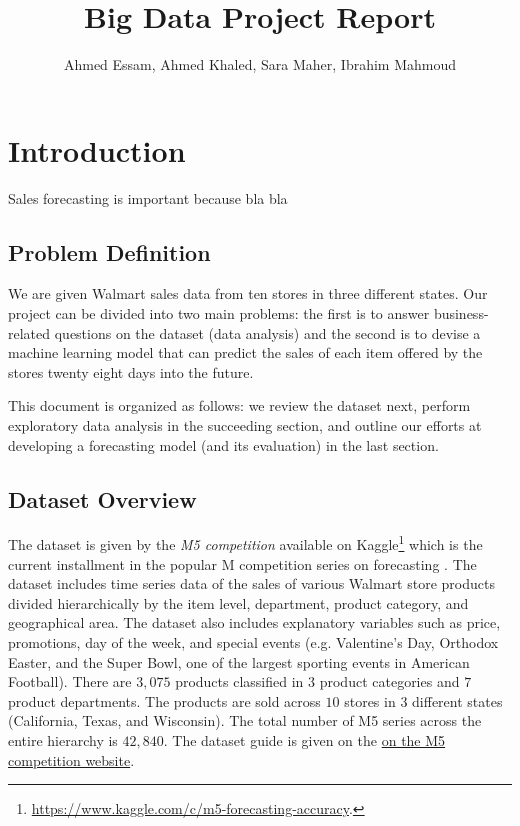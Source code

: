 \documentclass[12pt]{article}
\begin{document}
\title{Big Data Project Report}
\author{Ahmed Essam, Ahmed Khaled, Sara Maher, Ibrahim Mahmoud}

\maketitle


\tableofcontents
\clearpage
\section{Introduction}
Sales forecasting is important because bla bla

\subsection{Problem Definition}
We are given Walmart sales data from ten stores in three different states. Our project can be divided into two main problems: the first is to answer business-related questions on the dataset (data analysis) and the second is to devise a machine learning model that can predict the sales of each item offered by the stores twenty eight days into the future. 

This document is organized as follows: we review the dataset next, perform exploratory data analysis in the succeeding section, and outline our efforts at developing a forecasting model (and its evaluation) in the last section.

\subsection{Dataset Overview}
The dataset is given by the \emph{M5 competition} available on Kaggle\footnote{\url{https://www.kaggle.com/c/m5-forecasting-accuracy}.} which is the current installment in the popular M competition series on forecasting \citep{Makridakis2020}. The dataset includes time series data of the sales of various Walmart store products divided hierarchically by the item level, department, product category, and geographical area. The dataset also includes explanatory variables such as price, promotions, day of the week, and special events (e.g. Valentine's Day, Orthodox Easter, and the Super Bowl, one of the largest sporting events in American Football). There are $3,075$ products classified in $3$ product categories and $7$ product departments. The products are sold across $10$ stores in $3$ different states (California, Texas, and Wisconsin). The total number of M5 series across the entire hierarchy is $42,840$.  The dataset guide is given on the \href{https://mk0mcompetitiont8ake.kinstacdn.com/wp-content/uploads/2020/02/M5-Competitors-Guide_Final-1.pdf}{on the M5 competition website}.
\end{document}
